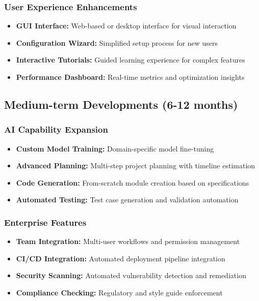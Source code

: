 \documentclass[12pt,a4paper]{article}
\begin{document}
\subsubsection{User Experience Enhancements}
\begin{itemize}
    \item \textbf{GUI Interface:} Web-based or desktop interface for visual interaction
    \item \textbf{Configuration Wizard:} Simplified setup process for new users
    \item \textbf{Interactive Tutorials:} Guided learning experience for complex features
    \item \textbf{Performance Dashboard:} Real-time metrics and optimization insights
\end{itemize}

\subsection{Medium-term Developments (6-12 months)}

\subsubsection{AI Capability Expansion}
\begin{itemize}
    \item \textbf{Custom Model Training:} Domain-specific model fine-tuning
    \item \textbf{Advanced Planning:} Multi-step project planning with timeline estimation
    \item \textbf{Code Generation:} From-scratch module creation based on specifications
    \item \textbf{Automated Testing:} Test case generation and validation automation
\end{itemize}

\subsubsection{Enterprise Features}
\begin{itemize}
    \item \textbf{Team Integration:} Multi-user workflows and permission management
    \item \textbf{CI/CD Integration:} Automated deployment pipeline integration
    \item \textbf{Security Scanning:} Automated vulnerability detection and remediation
    \item \textbf{Compliance Checking:} Regulatory and style guide enforcement
\end{itemize}
\end{document}
